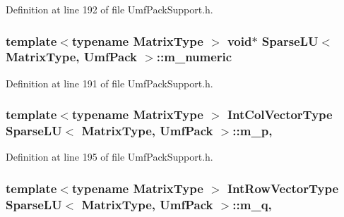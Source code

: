 Definition at line 192 of file Umf\-Pack\-Support.\-h.

\hypertarget{class_sparse_l_u_3_01_matrix_type_00_01_umf_pack_01_4_a05a6a0d11e3fdbbcec5a046e0f2f5b7a}{
\subsubsection[{m\-\_\-numeric}]{\setlength{\rightskip}{0pt plus 5cm}template$<$typename Matrix\-Type $>$ {\bf void}$\ast$ {\bf Sparse\-L\-U}$<$ Matrix\-Type, {\bf Umf\-Pack} $>$\-::m\-\_\-numeric\hspace{0.3cm}{\ttfamily [protected]}}}\label{class_sparse_l_u_3_01_matrix_type_00_01_umf_pack_01_4_a05a6a0d11e3fdbbcec5a046e0f2f5b7a}


Definition at line 191 of file Umf\-Pack\-Support.\-h.

\hypertarget{class_sparse_l_u_3_01_matrix_type_00_01_umf_pack_01_4_a3a81ccfca33be6598519b2e3c395f613}{
\subsubsection[{m\-\_\-p}]{\setlength{\rightskip}{0pt plus 5cm}template$<$typename Matrix\-Type $>$ {\bf Int\-Col\-Vector\-Type} {\bf Sparse\-L\-U}$<$ Matrix\-Type, {\bf Umf\-Pack} $>$\-::m\-\_\-p\hspace{0.3cm}{\ttfamily [mutable]}, {\ttfamily [protected]}}}\label{class_sparse_l_u_3_01_matrix_type_00_01_umf_pack_01_4_a3a81ccfca33be6598519b2e3c395f613}


Definition at line 195 of file Umf\-Pack\-Support.\-h.

\hypertarget{class_sparse_l_u_3_01_matrix_type_00_01_umf_pack_01_4_ac9a108ecc0517ad1793e082b536d67be}{
\subsubsection[{m\-\_\-q}]{\setlength{\rightskip}{0pt plus 5cm}template$<$typename Matrix\-Type $>$ {\bf Int\-Row\-Vector\-Type} {\bf Sparse\-L\-U}$<$ Matrix\-Type, {\bf Umf\-Pack} $>$\-::m\-\_\-q\hspace{0.3cm}{\ttfamily [mutable]}, {\ttfamily [protected]}}}\label{class_sparse_l_u_3_01_matrix_type_00_01_umf_pack_01_4_ac9a108ecc0517ad1793e082b536d67be}


